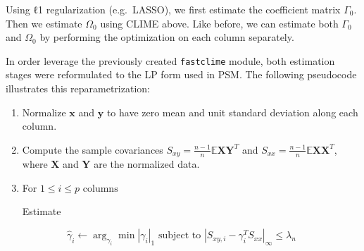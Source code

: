 \documentclass{article}
\begin{document}
Using ℓ1 regularization (e.g.~LASSO), we first estimate the coefficient
matrix $\Gamma_0$. Then we estimate $\Omega_0$ using CLIME above. Like
before, we can estimate both $\Gamma_0$ and $\Omega_0$ by performing the
optimization on each column separately.

In order leverage the previously created \texttt{fastclime} module, both estimation
stages were reformulated to the LP form used in PSM. The following
pseudocode illustrates this reparametrization:

    \begin{enumerate}
\def\labelenumi{\arabic{enumi}.}
\item
  Normalize $\textbf{x}$ and $\textbf{y}$ to have zero mean and unit
  standard deviation along each column.
\item
  Compute the sample covariances
  $S_{xy}=\frac{n-1}{n}\mathbb{E}\textbf{XY}^T$ and
  $S_{xx}=\frac{n-1}{n}\mathbb{E}\textbf{XX}^T$, where $\textbf{X}$ and
  $\textbf{Y}$ are the normalized data.
\item
  For $1\le i\le p\text{ columns}$

  Estimate

  \begin{equation}
  \hat{\gamma}_i\leftarrow\arg_{\gamma_i}\min |\gamma_i|_1\text{ subject to }|S_{xy,i}-\gamma_i^T S_{xx}|_\infty \le \lambda_n \quad\quad 
  \end{equation}


\end{enumerate}
\end{document}
